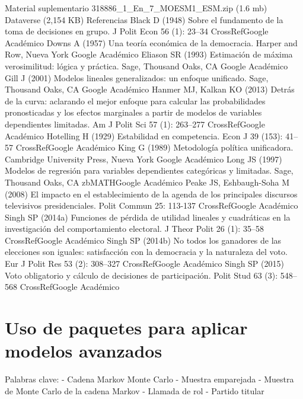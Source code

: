 \documentclass[
]{book}
\begin{document}
Material suplementario
318886\_1\_En\_7\_MOESM1\_ESM.zip (1.6 mb)
Dataverse (2,154 KB)
Referencias
Black D (1948) Sobre el fundamento de la toma de decisiones en grupo. J Polit Econ 56 (1): 23--34
CrossRefGoogle Académico
Downs A (1957) Una teoría económica de la democracia. Harper and Row, Nueva York
Google Académico
Eliason SR (1993) Estimación de máxima verosimilitud: lógica y práctica. Sage, Thousand Oaks, CA
Google Académico
Gill J (2001) Modelos lineales generalizados: un enfoque unificado. Sage, Thousand Oaks, CA
Google Académico
Hanmer MJ, Kalkan KO (2013) Detrás de la curva: aclarando el mejor enfoque para calcular las probabilidades pronosticadas y los efectos marginales a partir de modelos de variables dependientes limitadas. Am J Polit Sci 57 (1): 263--277
CrossRefGoogle Académico
Hotelling H (1929) Estabilidad en competencia. Econ J 39 (153): 41--57
CrossRefGoogle Académico
King G (1989) Metodología política unificadora. Cambridge University Press, Nueva York
Google Académico
Long JS (1997) Modelos de regresión para variables dependientes categóricas y limitadas. Sage, Thousand Oaks, CA
zbMATHGoogle Académico
Peake JS, Eshbaugh-Soha M (2008) El impacto en el establecimiento de la agenda de los principales discursos televisivos presidenciales. Polit Commun 25: 113-137
CrossRefGoogle Académico
Singh SP (2014a) Funciones de pérdida de utilidad lineales y cuadráticas en la investigación del comportamiento electoral. J Theor Polit 26 (1): 35--58
CrossRefGoogle Académico
Singh SP (2014b) No todos los ganadores de las elecciones son iguales: satisfacción con la democracia y la naturaleza del voto. Eur J Polit Res 53 (2): 308--327
CrossRefGoogle Académico
Singh SP (2015) Voto obligatorio y cálculo de decisiones de participación. Polit Stud 63 (3): 548--568
CrossRefGoogle Académico

\hypertarget{Usodepaquetesparaaplicarmodelosavanzados}{%
\chapter{Uso de paquetes para aplicar modelos avanzados}\label{Usodepaquetesparaaplicarmodelosavanzados}}

Palabras clave:
- Cadena Markov Monte Carlo
- Muestra emparejada
- Muestra de Monte Carlo de la cadena Markov
- Llamada de rol
- Partido titular
\end{document}
